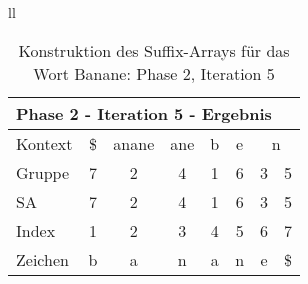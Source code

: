 \begin{table}[H]
\begin{adjustbox}{max width=\textwidth}
\begin{tabular}{ll}
\begin{tabular}{lccccccc}
\multicolumn{8}{l}{Phase 2 - Iteration 5 - Ergebnis}                                                                                                                                            \\ \hline
\multicolumn{1}{l|}{Kontext} & \multicolumn{1}{c|}{\$} & \multicolumn{1}{c|}{anane} & \multicolumn{1}{c|}{ane} & \multicolumn{1}{c|}{b} & \multicolumn{1}{c|}{e} & \multicolumn{2}{c}{n}        \\
\multicolumn{1}{l|}{Gruppe}  & \multicolumn{1}{c|}{7}  & \multicolumn{1}{c|}{2}     & \multicolumn{1}{c|}{4}   & \multicolumn{1}{c|}{1} & \multicolumn{1}{c|}{6} & 3 & 5                         \\ 
\multicolumn{1}{l|}{SA}      & \multicolumn{1}{c|}{7}  & \multicolumn{1}{c|}{2}     & \multicolumn{1}{c|}{4}   & \multicolumn{1}{c|}{1} & \multicolumn{1}{c|}{6} & 3 & \cellcolor[HTML]{\yellow}5 \\ \hline
\multicolumn{1}{l|}{Index}   & 1                       & 2                          & 3                        & 4                      & 5                      & 6 & 7                         \\
\multicolumn{1}{l|}{Zeichen} & b                       & a                          & n                        & a                      & n                      & e & \$                       
\end{tabular}

\end{tabular}
\end{adjustbox}

\caption[Konstruktion des Suffix-Arrays für das Wort Banane: Phase 2, Iteration 5]{Konstruktion des Suffix-Arrays für das Wort Banane: Phase 2, Iteration 5}
\label{fig_banane_2_5} 
\end{table}
